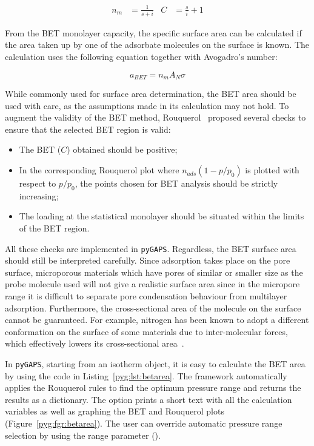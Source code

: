 \begin{align}
	n_{m} & = \frac{1}{s+i} & C & = \frac{s}{i} + 1
\end{align}

From the BET monolayer capacity, the specific surface area can be
calculated if the area taken up by one of the adsorbate molecules
on the surface is known. The calculation uses the following equation
together with Avogadro's number:

\begin{equation}
	a_{BET} = n_m A_N \sigma
\end{equation}

While commonly used for surface area determination, the BET area
should be used with care, as the assumptions made in
its calculation may not hold. To augment the validity of the BET
method, Rouquerol~\cite{rouquerolAdsorptionPowdersPorous2013} proposed
several checks to ensure that the selected BET region is valid:

\begin{itemize}

	\item The BET (\(C\)) obtained should be positive;
	\item In the corresponding Rouquerol plot where \(n_{ads}(1-p/p_0)\)
	      is plotted with respect to \(p/p_0\), the points chosen for BET
	      analysis should be strictly increasing;
	\item The loading at the statistical monolayer should be
	      situated within the limits of the BET region.

\end{itemize}

All these checks are implemented in \texttt{pyGAPS}.
Regardless, the BET surface area should still be interpreted carefully.
Since adsorption takes place on the pore surface, microporous materials
which have pores of similar or smaller size as the probe molecule used
will not give a realistic surface area since in the micropore range
it is difficult to separate pore condensation behaviour from
multilayer adsorption. Furthermore, the cross-sectional
area of the molecule on the surface cannot be guaranteed. For example,
nitrogen has been known to adopt a different conformation on the surface
of some materials due to inter-molecular forces, which effectively
lowers its cross-sectional area~\cite{rouquerolAdsorptionPowdersPorous2013}.

In \texttt{pyGAPS}, starting from an isotherm object, it is easy to
calculate the BET area by using the code in Listing~\ref{pyg:lst:betarea}.
The framework automatically applies the Rouquerol rules to
find the optimum pressure range and returns the results as a
dictionary. The  option prints a short
text with all the calculation variables as well as graphing the
BET and Rouquerol plots (Figure~\ref{pyg:fgr:betarea}).
The user can override
automatic pressure range selection by using the range parameter
().

